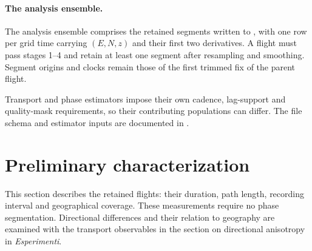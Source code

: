 \begin{revblock}
\paragraph{The analysis ensemble.}
\label{par:ensemble}
The analysis ensemble comprises the retained segments written to
, with one row per grid time carrying $(E,N,z)$ and their
first two derivatives. A flight must pass stages 1--4 and retain at least one
segment after resampling and smoothing. Segment origins and clocks remain those
of the first trimmed fix of the parent flight.

Transport and phase estimators impose their own cadence, lag-support and quality-mask
requirements, so their contributing populations can differ. The file schema and
estimator inputs are documented in .

\end{revblock}

\FloatBarrier

\section{Preliminary characterization}
\label{sec:prelim}
This section describes the retained flights: their duration, path length, recording
interval and geographical coverage. These measurements require no phase segmentation.
Directional differences and their relation to geography are examined with the transport
observables in the section on directional anisotropy in \emph{Esperimenti}.

